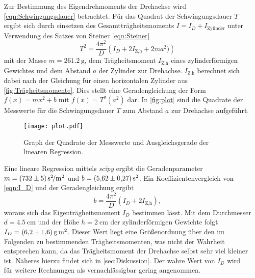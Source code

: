 Zur Bestimmung des Eigendrehmoments der Drehachse wird \autoref{eqn:Schwingungsdauer} betrachtet. Für das Quadrat der Schwingungsdauer $T$ ergibt sich
durch einsetzen des Gesamtträgheitsmoments $I = I_D + I_\text{Zylinder}$ unter Verwendung des Satzes von Steiner \eqref{eqn:Steiner}
\begin{equation}
  \label{eqn:I_D}
  T^2 = \frac{4\pi^2}{D}\left(I_D + 2I_\text{Z,h} + 2 m a^2) \right)
\end{equation}
mit der Masse $m = \qty{261.2}{\gram}$, dem Trägheitsmoment $I_\text{Z,h}$ eines zylinderförmigen Gewichtes und dem Abstand $a$ der Zylinder zur Drehachse. $I_\text{Z,h}$
berechnet sich dabei nach der Gleichung für einen horizontalen Zylinder aus \autoref{fig:Trägheitsmomente}.
Dies stellt eine Geradengleichung der Form $f(x) = mx^2 +b$ mit $f(x) = T^2(a^2)$ dar. In \autoref{fig:plot} sind die 
Quadrate der Messwerte für die Schwingungsdauer $T$ zum Abstand $a$ zur Drehachse aufgeführt. 
\begin{figure}
  \centering
  \texttt{[image: plot.pdf]}
  \caption{Graph der Quadrate der Messwerte und Ausgleichsgerade der linearen Regression. \cite{matplotlib}}
  \label{fig:plot}
\end{figure}
Eine lineare Regression mittels \textit{scipy} \cite{scipy} ergibt die Geradenparameter $m = \qty{732 +- 5}{\second\squared\per\metre\squared}$ und 
$b = \qty{5.62 +- 0.27}{\second\squared}$. Ein Koeffizientenvergleich von \autoref{eqn:I_D} und der Geradengleichung ergibt 
\begin{equation*}
  b = \frac{4\pi^2}{D}(I_D + 2I_\text{Z,h}),
\end{equation*}
woraus sich das Eigenträgheitsmoment $I_D$ bestimmen lässt. Mit dem Durchmesser $d = \qty{4.5}{\centi\metre}$ und der Höhe $h = \qty{2}{\centi\metre}$ der zylinderförmigen
Gewichte folgt $I_D = \qty{6.2 +- 1.6}{\gram\square\metre}$. Dieser Wert liegt eine Größenordnung über den im Folgenden zu bestimmenden Trägheitsmomenten, was nicht der 
Wahrheit entsprechen kann, da das Trägheitsmoment der Drehachse selbst sehr viel kleiner ist. Näheres hierzu findet sich in \autoref{sec:Diskussion}. Der wahre Wert von
$I_D$ wird für weitere Rechnungen als vernachlässigbar gering angenommen.
